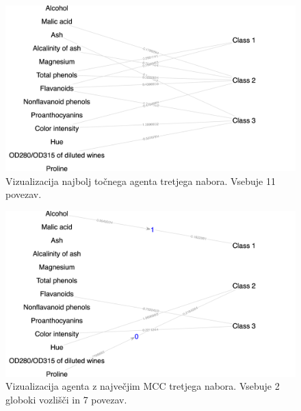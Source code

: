 \begin{figure}[H]
    \begin{center}
        \includegraphics[width=13cm]{wine/3/acc_g}
    \end{center}
    \caption{Vizualizacija najbolj točnega agenta tretjega nabora. Vsebuje 11 povezav.}
    \label{fig:wine_acc_3_g}
\end{figure}

\begin{figure}[H]
    \begin{center}
        \includegraphics[width=13cm]{wine/3/mcc_g}
    \end{center}
    \caption{Vizualizacija agenta z največjim MCC tretjega nabora. Vsebuje 2 globoki vozlišči in 7 povezav.}
    \label{fig:wine_mcc_3_g}
\end{figure}